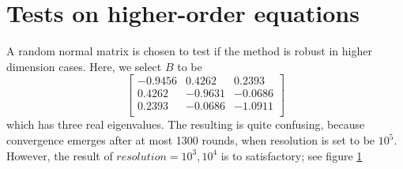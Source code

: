 \documentclass[a4paper]{article}
\begin{document}
\section{Tests on higher-order equations}
A random normal matrix is chosen to test if the method is robust in higher dimension cases.
Here, we select $B$ to be
$$
\begin{bmatrix}
-0.9456 & 0.4262 & 0.2393 \\
0.4262 & -0.9631 & -0.0686 \\
0.2393 & -0.0686 & -1.0911 \\
\end{bmatrix}
$$
which has three real eigenvalues.
The resulting is quite confusing, because convergence emerges after at most 1300 rounds, when resolution is set to be $10^5$.
However, the result of $resolution=10^3, 10^4$ is to satisfactory; see figure \ref{fig:p3-newB}
\begin{figure}[h]
	\centering
	\label{fig:p3-newB}
\end{figure}
\end{document}
